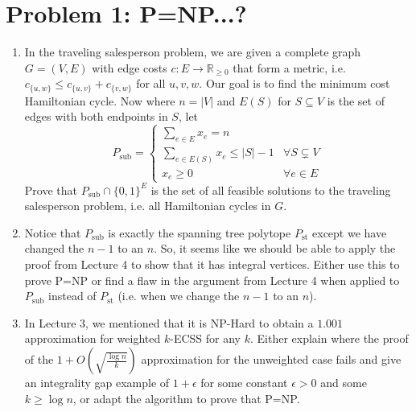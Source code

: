

\renewcommand{\P}[1]{{\mathbb{P}}\left[#1\right]}
\renewcommand{\PP}[2]{{\mathbb{P}}_{#1}\left[#2\right]}
\renewcommand{\E}[1]{{\mathbb{E}}\left[#1\right]}
\renewcommand{\EE}[2]{{\mathbb{E}}_{#1}\left[#2\right]}
\renewcommand{\R}{\ensuremath{\mathbb R}}
\renewcommand{\Z}{\ensuremath{\mathbb Z}}
\def\cI{{\cal I}}



\noindent
   \begin{center}
   \end{center}


\section{Problem 1: P=NP...?} 

\begin{enumerate}
	\item In the traveling salesperson problem, we are given a complete graph $G=(V,E)$ with edge costs $c: E \to \R_{\ge 0}$ that form a metric, i.e. $c_{\{u,w\}} \le c_{\{u,v\}}+c_{\{v,w\}}$ for all $u,v,w$. Our goal is to find the minimum cost Hamiltonian cycle. Now where $n=|V|$ and $E(S)$ for $S \subseteq V$ is the set of edges with both endpoints in $S$, let $$P_{\mathrm{sub}} = \begin{cases} \sum_{e \in E} x_e = n \\ \sum_{e \in E(S)} x_e \le |S|-1 & \forall S \subsetneq V \\ x_e \ge 0 & \forall e \in E \end{cases}$$
	Prove that $P_{\mathrm{sub}} \cap \{0,1\}^E$ is the set of all feasible solutions to the traveling salesperson problem, i.e. all Hamiltonian cycles in $G$. 
	\item Notice that $P_{\mathrm{sub}}$ is exactly the spanning tree polytope $P_{\mathrm{st}}$ except we have changed the $n-1$ to an $n$. So, it seems like we should be able to apply the proof from Lecture 4 to show that it has integral vertices. Either use this to prove P=NP or find a flaw in the argument from Lecture 4 when applied to $P_{\mathrm{sub}}$ instead of $P_{\mathrm{st}}$ (i.e. when we change the $n-1$ to an $n$).
	\item In Lecture 3, we mentioned that it is NP-Hard to obtain a $1.001$ approximation for weighted $k$-ECSS for any $k$. Either explain where the proof of the $1+O(\sqrt{\frac{\log n}{k}})$ approximation for the unweighted case fails and give an integrality gap example of $1+\epsilon$ for some constant $\epsilon > 0$ and some $k \ge \log n$, or adapt the algorithm to prove that P=NP.  
\end{enumerate}

